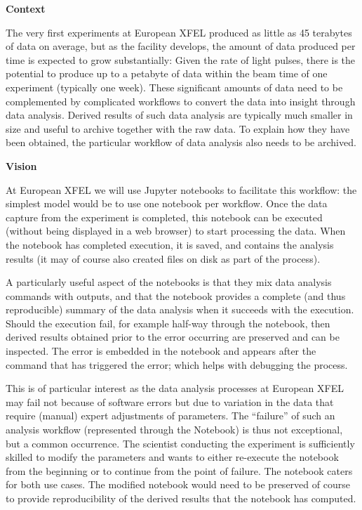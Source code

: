  \textbf{Context}

  The very first experiments at European XFEL
  produced as little as 45 terabytes of data on average, but as the
  facility develops, the amount of data produced per time is expected
  to grow substantially: Given the rate of light pulses, there is the
  potential to produce up to a petabyte of data within the beam time
  of one experiment (typically one week). These significant amounts of
  data need to be complemented by complicated workflows to convert the
  data into insight through data analysis. Derived results of such
  data analysis are typically much smaller in size and useful to
  archive together with the raw data. To explain how they have been
  obtained, the particular workflow of data analysis also needs to be
  archived.

  \medskip
  \textbf{Vision}

  At European XFEL we will use Jupyter notebooks to facilitate
  this workflow: the simplest model would be to use one notebook per
  workflow. Once the data capture from the experiment is completed,
  this notebook can be executed (without being displayed in a web
  browser) to start processing the data. When the notebook has
  completed execution, it is saved, and contains the analysis results
  (it may of course also created files on disk as part of the
  process).

  A particularly useful aspect of the notebooks is that they mix data
  analysis commands with outputs, and that the notebook provides a
  complete (and thus reproducible) summary of the data analysis when
  it succeeds with the execution. Should the execution fail, for
  example half-way through the notebook, then derived results obtained
  prior to the error occurring are preserved and can be inspected. The
  error is embedded in the notebook and appears after the command that
  has triggered the error; which helps with debugging the process.

  This is of particular interest as the data analysis processes at
  European XFEL may fail not because of software errors but due to
  variation in the data that require (manual) expert adjustments of
  parameters. The ``failure'' of such an analysis workflow
  (represented through the Notebook) is thus not exceptional, but a
  common occurrence. The scientist conducting the experiment is
  sufficiently skilled to modify the parameters and wants to either
  re-execute the notebook from the beginning or to continue from the
  point of failure. The notebook caters for both use cases. The
  modified notebook would need to be preserved of course to provide
  reproducibility of the derived results that the notebook has
  computed.

